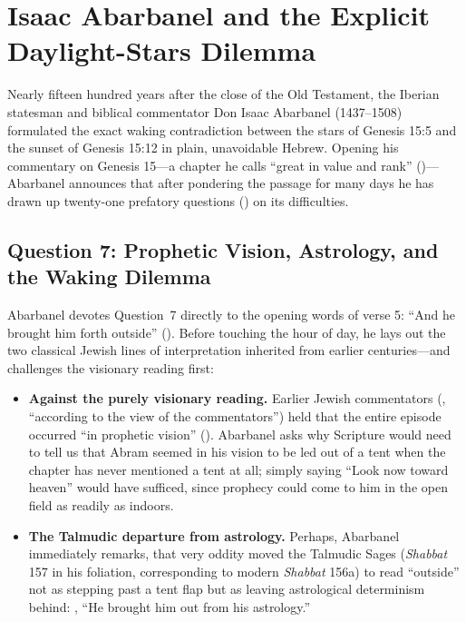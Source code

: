 \section{Isaac Abarbanel and the Explicit Daylight-Stars Dilemma}

Nearly fifteen hundred years after the close of the Old Testament, the Iberian statesman and biblical commentator Don Isaac Abarbanel (1437--1508) formulated the exact waking contradiction between the stars of Genesis 15:5 and the sunset of Genesis 15:12 in plain, unavoidable Hebrew. Opening his commentary on Genesis 15---a chapter he calls ``great in value and rank'' ()---Abarbanel announces that after pondering the passage for many days he has drawn up twenty-one prefatory questions () on its difficulties.

\subsection{Question 7: Prophetic Vision, Astrology, and the Waking Dilemma}

Abarbanel devotes Question~7 directly to the opening words of verse 5: ``And he brought him forth outside'' (). Before touching the hour of day, he lays out the two classical Jewish lines of interpretation inherited from earlier centuries---and challenges the visionary reading first:

\begin{itemize}
  \item \textbf{Against the purely visionary reading.} Earlier Jewish commentators (, ``according to the view of the commentators'') held that the entire episode occurred ``in prophetic vision'' (). Abarbanel asks why Scripture would need to tell us that Abram seemed in his vision to be led out of a tent when the chapter has never mentioned a tent at all; simply saying ``Look now toward heaven'' would have sufficed, since prophecy could come to him in the open field as readily as indoors.
  \item \textbf{The Talmudic departure from astrology.} Perhaps, Abarbanel immediately remarks, that very oddity moved the Talmudic Sages (\emph{Shabbat} 157 in his foliation, corresponding to modern \emph{Shabbat} 156a) to read ``outside'' not as stepping past a tent flap but as leaving astrological determinism behind: , ``He brought him out from his astrology.''
\end{itemize}

